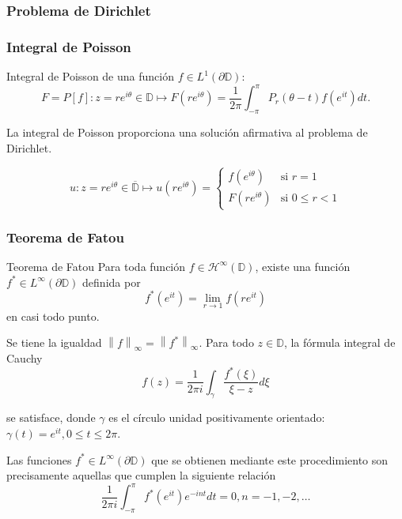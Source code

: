 \documentclass[spanish, a4paper, 12pt, final, slideColor, nototal, colorBG, pdf, noaccumulate, darkblue]{beamer}
\providecommand{\norm}[1]{\left\lVert#1\right\rVert}
\providecommand{\norminf}[1]{\norm{#1}_{\infty}}
\providecommand{\bholomorphic}[1]{\mathcal{H}^{\infty}(#1)}
\newcommand{\disk}{\mathbb{D}}
\newcommand{\closedisk}{\overline{\disk}}
\begin{document}
\begin{frame}
    \frametitle{Problema de Dirichlet}
    \begin{block}{}

    \end{block}
\end{frame}


\begin{frame}
    \frametitle{Integral de Poisson}
    Integral de Poisson de una función $f \in L^1(\partial \disk)$:
    \begin{equation*}
        F = P[f]: z=re^{i \theta} \in \disk \mapsto F(re^{i \theta}) = \dfrac{1}{2 \pi} \int_{- \pi}^{\pi} P_r (\theta - t) f(e^{it}) dt.
    \end{equation*}

    La integral de Poisson proporciona una solución afirmativa al problema de Dirichlet.

    \begin{equation*}
        u : z = re^{i \theta} \in \closedisk \mapsto u(re^{i \theta}) =
        \begin{cases}
            f(e^{i\theta}) & \text{si } r=1 \\
            F(re^{i\theta}) & \text{si } 0 \leq r<1
        \end{cases}
    \end{equation*}
\end{frame}

\begin{frame}
    \frametitle{Teorema de Fatou}
    \begin{block}{Teorema de Fatou}
         Para toda función $f \in \bholomorphic{\disk}$, existe una función $f^* \in L^{\infty} (\partial \disk)$ definida por
    \begin{equation}
        f^*(e^{it}) = \lim_{r \to 1} f(re^{it})
    \end{equation}
    en casi todo punto.

    Se tiene la igualdad $\norminf{f} = \norminf{f^*}$. Para todo $z \in \disk$, la fórmula integral de Cauchy
    \begin{equation}
        f(z) = \dfrac{1}{2 \pi i} \int_{\gamma} \dfrac{f^*(\xi)}{\xi - z} d\xi
    \end{equation}

    se satisface, donde $\gamma$ es el círculo unidad positivamente orientado: $\gamma(t) = e^{it}, 0 \leq t \leq 2 \pi$.

    Las funciones $f^* \in L^{\infty}(\partial \disk)$ que se obtienen mediante este procedimiento son precisamente aquellas que cumplen la siguiente relación
    \begin{equation}
        \dfrac{1}{2 \pi i} \int_{-\pi}^{\pi} f^*(e^{it})e^{-int} dt = 0, n = -1,-2, \dots
    \end{equation}
    \end{block}
\end{frame}
\end{document}
